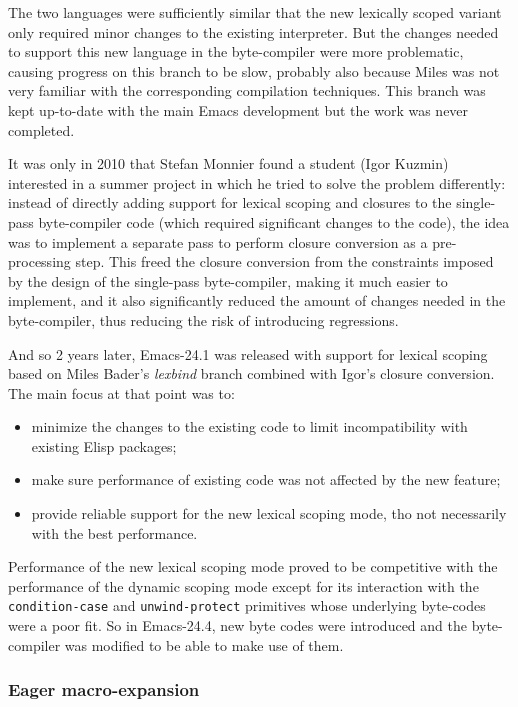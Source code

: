 \documentclass[format=acmsmall, review=false, screen=true]{acmart}
\newcommand \Elisp {Elisp}
\begin{document}
The two languages were sufficiently similar that the new lexically scoped
variant only required minor changes to the existing interpreter.  But the
changes needed to support this new language in the byte-compiler were more
problematic, causing progress on this branch to be slow, probably also
because Miles was not very familiar with the corresponding
compilation techniques.  This branch was kept up-to-date with the main Emacs
development but the work was never completed.

It was only in 2010 that Stefan Monnier found a student (Igor Kuzmin)
interested in a summer project in which he tried to solve the problem
differently: instead of directly adding support for lexical scoping and
closures to the single-pass byte-compiler code (which required significant
changes to the code), the idea was to implement a separate pass to perform
closure conversion as a pre-processing step.  This freed the closure
conversion from the constraints imposed by the design of the single-pass
byte-compiler, making it much easier to implement, and it also significantly
reduced the amount of changes needed in the byte-compiler, thus reducing the
risk of introducing regressions.

And so 2 years later, Emacs-24.1 was released with support for lexical
scoping based on Miles Bader's \emph{lexbind} branch combined with Igor's
closure conversion.  The main focus at that point was to:
\begin{itemize}
\item minimize the changes to the existing code to limit incompatibility
  with existing \Elisp{} packages;
\item make sure performance of existing code was not affected by the
  new feature;
\item provide reliable support for the new lexical scoping mode, tho not
  necessarily with the best performance.
\end{itemize}

Performance of the new lexical scoping mode proved to be competitive
with the performance of the dynamic scoping mode except for its interaction
with the \texttt{condition-case} and \texttt{unwind-protect} primitives
whose underlying byte-codes were a poor fit.  So in Emacs-24.4, new byte
codes were introduced and the byte-compiler was modified to be able to make
use of them.

\subsubsection{Eager macro-expansion} %
\end{document}
